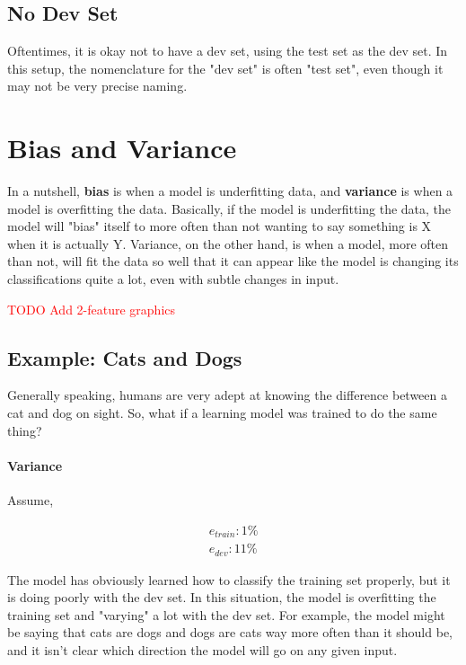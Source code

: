 \documentclass{article}
\newcommand\todo[1]{\textcolor{red}{TODO #1}}
\begin{document}
\subsection{No Dev Set}

Oftentimes, it is okay not to have a dev set, using the test set as the dev set.  In this setup, the nomenclature for the "dev set" is often "test set", even though it may not be very precise naming.

\section{Bias and Variance}

In a nutshell, \textbf{bias} is when a model is underfitting data, and \textbf{variance} is when a model is overfitting the data.  Basically, if the model is underfitting the data, the model will "bias" itself to more often than not wanting to say something is X when it is actually Y.  Variance, on the other hand, is when a model, more often than not, will fit the data so well that it can appear like the model is changing its classifications quite a lot, even with subtle changes in input.

\todo{Add 2-feature graphics}

\subsection{Example: Cats and Dogs}

Generally speaking, humans are very adept at knowing the difference between a cat and dog on sight.  So, what if a learning model was trained to do the same thing?

\paragraph{Variance}

Assume,

\begin{gather}
e_{train}: 1\% \\
e_{dev}: 11\%
\end{gather}

The model has obviously learned how to classify the training set properly, but it is doing poorly with the dev set.  In this situation, the model is overfitting the training set and "varying" a lot with the dev set.  For example, the model might be saying that cats are dogs and dogs are cats way more often than it should be, and it isn't clear which direction the model will go on any given input.
\end{document}
